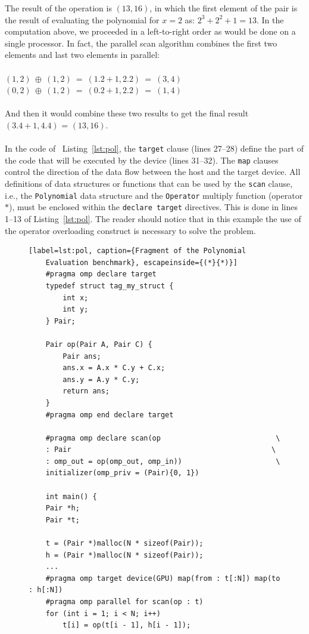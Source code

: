 \documentclass[Ingles]{ic-tese-v1}
\newcommand{\ttt}[1]{{\texttt{#1}}}
\newcommand{\rlst}[1]{Listing~\ref{lst:#1}}
\begin{document}
The result of the operation is $(13, 16)$, in which the first element of the pair  is the result  of 
evaluating the polynomial for $x = 2$  as: $2^{3} + 2^{2} + 1 = 13$.
In the computation above, we proceeded in a left-to-right order as would be
done on a single processor. In fact, the parallel scan algorithm 
combines the first two elements and last two elements in parallel:\\\\
$(1, 2) \:\oplus\: (1, 2) \:=\: (1 . 2 + 1, 2 . 2) \:=\: (3, 4)$\\
$(0, 2) \:\oplus\: (1, 2) \:=\: (0 . 2 + 1, 2 . 2) \:=\: (1, 4)$\\\\
And then it would combine these two results to get the final result $(3 . 4 + 1, 4 . 4)$
= $(13, 16)$.
\\\\
In the code of ~\rlst{pol}, the \ttt{target} clause (lines 27--28) define the part of the code
that will  be  executed by  the device  (lines 31--32).  The \ttt{map} clauses control the direction  of the data flow
between the host and the target device. All definitions of data structures
or functions  that can be used  by the \ttt{scan} clause,  i.e., the
\ttt{Polynomial} data  structure and the \ttt{Operator}  multiply function
(operator$*$),  must   be  enclosed  within  the   \ttt{declare  target}
directives. This is done in lines 1--13 of \rlst{pol}.
The reader should notice that in this example the use of the operator overloading
construct is necessary to solve the problem.

\begin{figure}[t]
	\lstset{basicstyle=\scriptsize}
	\begin{lstlisting}[label=lst:pol, caption={Fragment of the Polynomial
	Evaluation benchmark}, escapeinside={(*}{*)}]
	#pragma omp declare target
	typedef struct tag_my_struct {
		int x;
		int y;
	} Pair;

	Pair op(Pair A, Pair C) {
		Pair ans;
		ans.x = A.x * C.y + C.x;
		ans.y = A.y * C.y;
		return ans;
	}
	#pragma omp end declare target

	#pragma omp declare scan(op                           \
	: Pair                                               \
	: omp_out = op(omp_out, omp_in))                      \
	initializer(omp_priv = (Pair){0, 1})

	int main() {
	Pair *h;
	Pair *t;

	t = (Pair *)malloc(N * sizeof(Pair));
	h = (Pair *)malloc(N * sizeof(Pair));
	...
	#pragma omp target device(GPU) map(from : t[:N]) map(to : h[:N])
	#pragma omp parallel for scan(op : t)
	for (int i = 1; i < N; i++)
		t[i] = op(t[i - 1], h[i - 1]);

	\end{lstlisting}
\end{figure}
\end{document}
